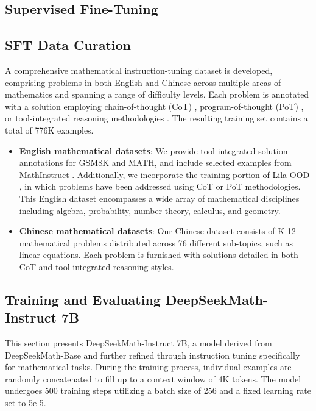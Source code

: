 \begin{itemize}[topsep=0pt]
\section{Supervised Fine-Tuning}

\subsection{SFT Data Curation}

A comprehensive mathematical instruction-tuning dataset is developed, comprising problems in both English and Chinese across multiple areas of mathematics and spanning a range of difficulty levels. Each problem is annotated with a solution employing chain-of-thought (CoT) \citep{cot}, program-of-thought (PoT) \citep{pot,pal}, or tool-integrated reasoning methodologies \citep{tora}. The resulting training set contains a total of 776K examples.

\begin{itemize}[topsep=0pt]
    \item \textbf{English mathematical datasets}: We provide tool-integrated solution annotations for GSM8K and MATH, and include selected examples from MathInstruct \citep{MathInstruct}. Additionally, we incorporate the training portion of Lila-OOD \citep{lila}, in which problems have been addressed using CoT or PoT methodologies. This English dataset encompasses a wide array of mathematical disciplines including algebra, probability, number theory, calculus, and geometry.
    \item \textbf{Chinese mathematical datasets}: Our Chinese dataset consists of K-12 mathematical problems distributed across 76 different sub-topics, such as linear equations. Each problem is furnished with solutions detailed in both CoT and tool-integrated reasoning styles.
\end{itemize}

\subsection{Training and Evaluating DeepSeekMath-Instruct 7B}

This section presents DeepSeekMath-Instruct 7B, a model derived from DeepSeekMath-Base and further refined through instruction tuning specifically for mathematical tasks. During the training process, individual examples are randomly concatenated to fill up to a context window of 4K tokens. The model undergoes 500 training steps utilizing a batch size of 256 and a fixed learning rate set to 5e-5.


\end{itemize}
